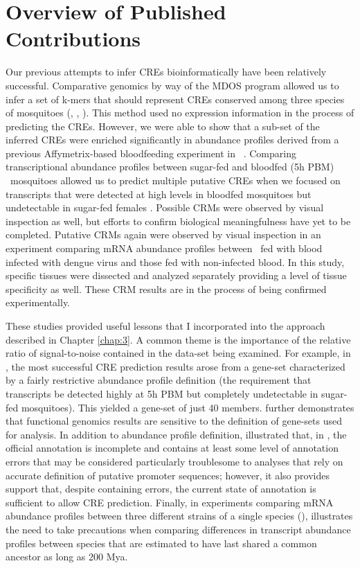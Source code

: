 \chapter{Overview of Published Contributions}


Our previous attempts to infer \glspl{CRE} bioinformatically have been relatively successful.
Comparative genomics by way of the \gls{MDOS} program allowed us to infer a set of k-mers that should represent \glspl{CRE} conserved among three species of mosquitoes (\Aa, \Ag, \Cq).
This method used no expression information in the process of predicting the \glspl{CRE}.
However, we were able to show that a sub-set of the inferred \glspl{CRE} were enriched significantly in abundance profiles derived from a previous Affymetrix-based bloodfeeding experiment in \Ag\ \cite{Marinotti2005,Marinotti2006,Sieglaff2009}.
Comparing transcriptional abundance profiles between sugar-fed and bloodfed (5h \gls{PBM}) \Aa\ mosquitoes allowed us to predict multiple putative \glspl{CRE} when we focused on transcripts that were detected at high levels in bloodfed mosquitoes but undetectable in sugar-fed females \cite{Bonizzoni2011}.
Possible \glspl{CRM} were observed by visual inspection as well, but efforts to confirm biological meaningfulness have yet to be completed.
Putative \glspl{CRM} again were observed by visual inspection in an experiment comparing mRNA abundance profiles between \Aa\ fed with blood infected with dengue virus and those fed with non-infected blood.
In this study, specific tissues were dissected and analyzed separately providing a level of tissue specificity as well.
These \gls{CRM} results are in the process of being confirmed experimentally.

These studies provided useful lessons that I incorporated into the approach described in Chapter \ref{chap:3}.
A common theme is the importance of the relative ratio of signal-to-noise contained in the data-set being examined.
For example, in \citet{Bonizzoni2011}, the most successful \gls{CRE} prediction results arose from a gene-set characterized by a fairly restrictive abundance profile definition (the requirement that transcripts be detected highly at 5h \gls{PBM} but completely undetectable in sugar-fed mosquitoes).
This yielded a gene-set of just 40 members.
\citet{bonizzoni2012complex} further demonstrates that \gls{functional genomics} results are sensitive to the definition of gene-sets used for analysis.
In addition to abundance profile definition, \citet{Bonizzoni2011} illustrated that, in \Aa, the official annotation is incomplete and contains at least some level of annotation errors that may be considered particularly troublesome to analyses that rely on accurate definition of putative promoter sequences; however, it also provides support that, despite containing errors, the current state of annotation is sufficient to allow \gls{CRE} prediction.
Finally, in experiments comparing mRNA abundance profiles between three different strains of a single species (\Aa), \citet{bonizzoni2012strain} illustrates the need to take precautions when comparing differences in transcript abundance profiles between species that are estimated to have last shared a common ancestor as long as 200 \gls{Mya}.


